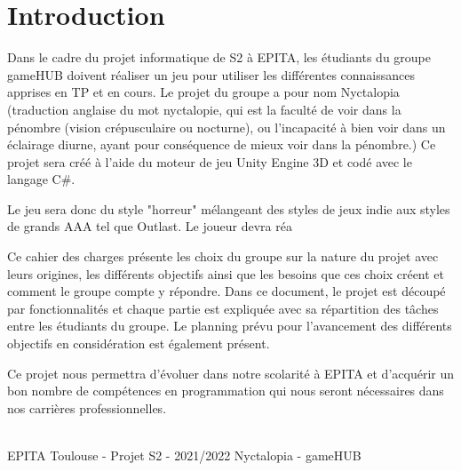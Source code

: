 \section{Introduction}
Dans le cadre du projet informatique de S2 à EPITA, les étudiants du groupe gameHUB doivent réaliser un jeu pour utiliser les différentes connaissances apprises en TP et en cours. 
Le projet du groupe a pour nom Nyctalopia (traduction anglaise du mot nyctalopie, qui est la faculté de voir dans la pénombre (vision crépusculaire ou nocturne), ou l'incapacité à bien voir dans un éclairage diurne, ayant pour conséquence de mieux voir dans la pénombre.) Ce projet sera créé à l’aide du moteur de jeu Unity Engine 3D et codé avec le langage C\#.

Le jeu sera donc du style "horreur" mélangeant des styles de jeux indie aux styles de grands AAA tel que Outlast.
Le joueur devra réa

Ce cahier des charges présente les choix du groupe sur la nature du projet
avec leurs origines, les différents objectifs ainsi que les besoins que ces choix
créent et comment le groupe compte y répondre. Dans ce document, le projet
est découpé par fonctionnalités et chaque partie est expliquée avec sa répartition
des tâches entre les étudiants du groupe. Le planning prévu pour l’avancement
des différents objectifs en considération est également présent.


Ce projet nous permettra d’évoluer dans notre scolarité à EPITA et d’acquérir
un bon nombre de compétences en programmation qui nous seront nécessaires
dans nos carrières professionnelles.

\vfill
\noindent\makebox[\linewidth]{\rule{.8\paperwidth}{.6pt}}\\[0.2cm]
EPITA Toulouse - Projet S2 - 2021/2022 \hfill Nyctalopia - gameHUB
\noindent\makebox[\linewidth]{\rule{.8\paperwidth}{.6pt}}

\newpage